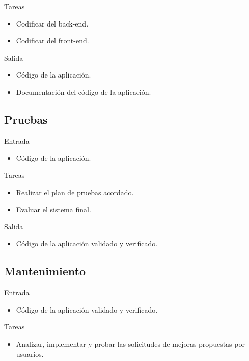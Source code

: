 Tareas
\begin{itemize}[leftmargin=3.5em]
  \item Codificar del \gls{back-end}.
  \item Codificar del \gls{front-end}.
\end{itemize}

Salida
\begin{itemize}[leftmargin=3.5em]
  \item Código de la aplicación.
  \item Documentación del código de la aplicación.
\end{itemize}

\subsection*{Pruebas\label{ssec:dp:pruebas}}

Entrada
\begin{itemize}[leftmargin=3.5em]
  \item Código de la aplicación.
\end{itemize}

Tareas
\begin{itemize}[leftmargin=3.5em]
  \item Realizar el plan de pruebas acordado.
  \item Evaluar el sistema final.
\end{itemize}

Salida
\begin{itemize}[leftmargin=3.5em]
  \item Código de la aplicación validado y verificado.
\end{itemize}

\subsection*{Mantenimiento\label{ssec:dp:mantenimiento}}

Entrada
\begin{itemize}[leftmargin=3.5em]
  \item Código de la aplicación validado y verificado.
\end{itemize}

Tareas
\begin{itemize}[leftmargin=3.5em]
  \item Analizar, implementar y probar las solicitudes de mejoras propuestas por usuarios. 
\end{itemize}

